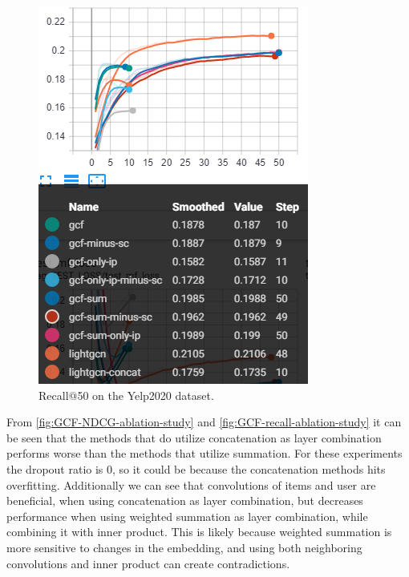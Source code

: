 \begin{figure}[h!]
    \includegraphics[width=\linewidth]{figures/gcf-all-recall.png}
    \caption{Recall@50 on the Yelp2020 dataset.}
    \label{fig:GCF-recall-ablation-study}
\end{figure}
From \autoref{fig:GCF-NDCG-ablation-study} and \autoref{fig:GCF-recall-ablation-study} it can be seen that the methods that do utilize concatenation as layer combination performs worse than the methods that utilize summation.
For these experiments the dropout ratio is 0, so it could be because the concatenation methods hits overfitting.
Additionally we can see that convolutions of items and user are beneficial, when using concatenation as layer combination, but decreases performance when using weighted summation as layer combination, while combining it with inner product.
This is likely because weighted summation is more sensitive to changes in the embedding, and using both neighboring convolutions and inner product can create contradictions.

